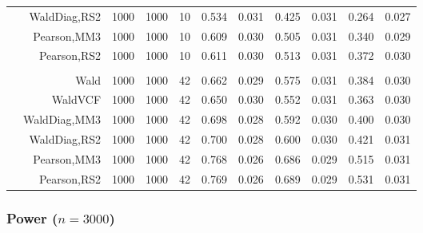 \documentclass[
]{article}
\begin{document}
\begin{table}[H]
{\begin{tabular}[t]{lrrrrrrrlrr}
\hspace{1em} & WaldDiag,RS2 & 1000 & 1000 & 10 & 0.534 & 0.031 & 0.425 & 0.031 & 0.264 & 0.027\\

\hspace{1em} & Pearson,MM3 & 1000 & 1000 & 10 & 0.609 & 0.030 & 0.505 & 0.031 & 0.340 & 0.029\\

\hspace{1em} & Pearson,RS2 & 1000 & 1000 & 10 & 0.611 & 0.030 & 0.513 & 0.031 & 0.372 & 0.030\\
\cmidrule{1-11}
\addlinespace[0.3em]
\multicolumn{11}{l}{\textbf{3F 15V}}\\
\hspace{1em} & Wald & 1000 & 1000 & 42 & 0.662 & 0.029 & 0.575 & 0.031 & 0.384 & 0.030\\

\hspace{1em} & WaldVCF & 1000 & 1000 & 42 & 0.650 & 0.030 & 0.552 & 0.031 & 0.363 & 0.030\\

\hspace{1em} & WaldDiag,MM3 & 1000 & 1000 & 42 & 0.698 & 0.028 & 0.592 & 0.030 & 0.400 & 0.030\\

\hspace{1em} & WaldDiag,RS2 & 1000 & 1000 & 42 & 0.700 & 0.028 & 0.600 & 0.030 & 0.421 & 0.031\\

\hspace{1em} & Pearson,MM3 & 1000 & 1000 & 42 & 0.768 & 0.026 & 0.686 & 0.029 & 0.515 & 0.031\\

\hspace{1em} & Pearson,RS2 & 1000 & 1000 & 42 & 0.769 & 0.026 & 0.689 & 0.029 & 0.531 & 0.031\\
\bottomrule
\end{tabular}}
\endgroup{}
\end{table}

\hypertarget{power-n3000}{%
\subsubsection{\texorpdfstring{Power
(\(n=3000\))}{Power (n=3000)}}\label{power-n3000}}
\end{document}
